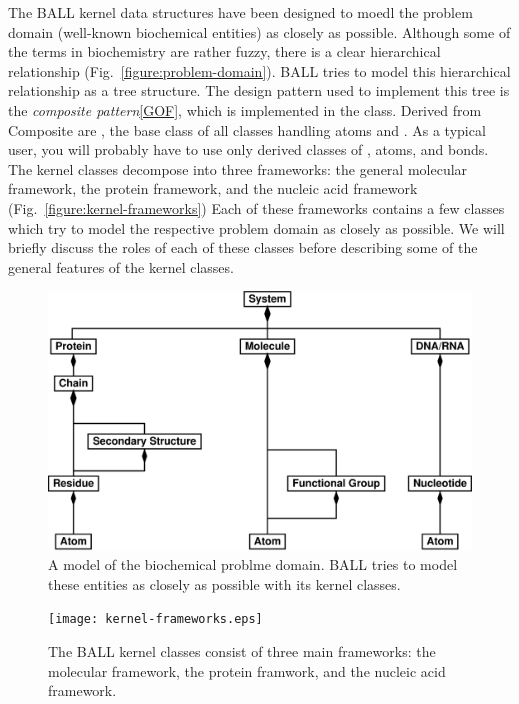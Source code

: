 The BALL kernel data structures have been designed to moedl the problem 
domain (\ie well-known biochemical entities) as closely as possible.
Although some of the terms in biochemistry are rather fuzzy, there is a clear
hierarchical relationship (Fig.~\ref{figure:problem-domain}).
BALL tries to model this hierarchical relationship as a tree structure.
The design pattern used to implement this tree is the {\em composite
pattern}\ref{GOF}, which is implemented in the  class.
Derived from Composite are , the base class of all
classes handling atoms and . As a typical user, you will probably
have to use only derived classes of , atoms, and bonds.
The kernel classes decompose into three frameworks: the general molecular
framework, the protein framework, and the nucleic acid framework
(Fig.~\ref{figure:kernel-frameworks})
Each of these frameworks contains a few classes which try to model the
respective problem domain as closely as possible. We will briefly discuss the
roles of each of these classes before describing some of the general features
of the kernel classes.

\begin{figure}[tb]
  \centering\includegraphics[width=\textwidth]{problem-domain.eps}
  \caption{A model of the biochemical problme domain. BALL tries to model
					these entities as closely as possible with its kernel classes.}
  \label{fig:problem-domain}
\end{figure}

\begin{figure}[tb]
  \centering\texttt{[image: kernel-frameworks.eps]}
  \caption{The BALL kernel classes consist of three main frameworks: the
molecular framework, the protein framwork, and the nucleic acid framework.}
  \label{fig:kernel-frameworks}
\end{figure}

